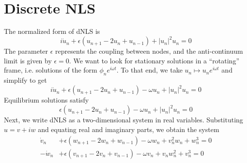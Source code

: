 \documentclass[12pt]{article}
\begin{document}
\section{Discrete NLS}
The normalized form of dNLS is
\begin{equation}\label{dNLS}
i\dot{u}_n + \epsilon(u_{n+1} - 2 u_n + u_{n-1}) + |u_n|^2 u_n = 0
\end{equation}
The parameter $\epsilon$ represents the coupling between nodes, and the anti-continuum limit is given by $\epsilon = 0$. We want to look for stationary solutions in a ``rotating'' frame, i.e. solutions of the form $\phi_n e^{i \omega t}$. To that end, we take $u_n \mapsto u_n e^{i \omega t}$ and simplify to get
\begin{equation}\label{dNLSrot}
i\dot{u}_n + \epsilon(u_{n+1} - 2 u_n + u_{n-1}) - \omega u_n + |u_n|^2 u_n = 0
\end{equation}
Equilibrium solutions satisfy
\begin{equation}\label{dNLSequilib}
\epsilon(u_{n+1} - 2 u_n + u_{n-1}) - \omega u_n + |u_n|^2 u_n = 0
\end{equation}
Next, we write dNLS as a two-dimensional system in real variables. Substituting $u = v + i w$ and equating real and imaginary parts, we obtain the system 
\begin{equation}\label{dNLSreal}
\begin{aligned}
\dot{v}_n  &+ \epsilon (w_{n+1} - 2 w_n + w_{n-1}) - \omega w_n + v_n^2 w_n + w_n^3 = 0 \\
-\dot{w}_n &+ \epsilon (v_{n+1} - 2 v_n + v_{n-1}) - \omega v_n + v_n w_n^2 + v_n^3 = 0
\end{aligned}
\end{equation}
\end{document}
